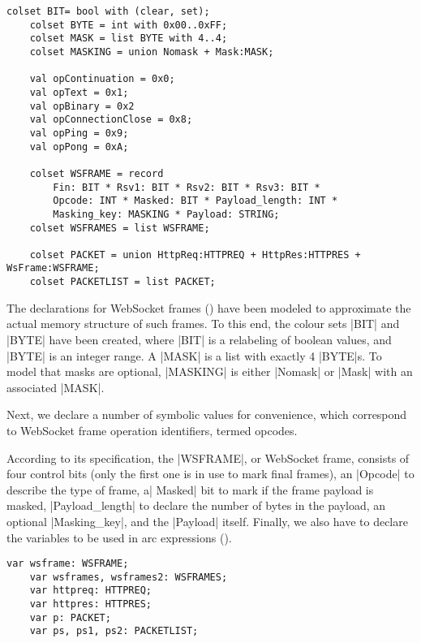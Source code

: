 	\begin{lstlisting}[label=lst:client_lib_colset_ws,caption=WebSocket colour
	sets,gobble=1,float] 
	colset BIT= bool with (clear, set);
	colset BYTE = int with 0x00..0xFF;
	colset MASK = list BYTE with 4..4;
	colset MASKING = union Nomask + Mask:MASK;
	
	val opContinuation = 0x0;
	val opText = 0x1;
	val opBinary = 0x2
	val opConnectionClose = 0x8;
	val opPing = 0x9;
	val opPong = 0xA;
	
	colset WSFRAME = record
		Fin: BIT * Rsv1: BIT * Rsv2: BIT * Rsv3: BIT * 
		Opcode: INT * Masked: BIT * Payload_length: INT * 
		Masking_key: MASKING * Payload: STRING;
	colset WSFRAMES = list WSFRAME;
	
	colset PACKET = union HttpReq:HTTPREQ + HttpRes:HTTPRES + WsFrame:WSFRAME;
	colset PACKETLIST = list PACKET;
	\end{lstlisting}
	
	The declarations for WebSocket frames () have
	been modeled to approximate the actual memory structure of such frames. To this
	end, the colour sets |BIT| and |BYTE| have been created, where |BIT| is a
	relabeling of boolean values, and |BYTE| is an integer range. A |MASK| is a
	list with exactly 4 |BYTE|s. To model that masks are optional, |MASKING| is
	either |Nomask| or |Mask| with an associated |MASK|.
	
	Next, we declare a number of symbolic values for convenience, which correspond
	to WebSocket frame operation identifiers, termed opcodes. 
	
	According to its specification, the |WSFRAME|, or WebSocket frame, consists
	of four control bits (only the first one is in use to mark final frames), an
	|Opcode| to describe the type of frame, a| Masked| bit to mark if the frame
	payload is masked, |Payload_length| to declare the number of bytes in the
	payload, an optional |Masking_key|, and the |Payload| itself. Finally, we
	also have to declare the variables to be used in arc expressions
	().
	
	\begin{lstlisting}[label=lst:client_lib_vars,caption=WebSocket
	Module Variables,gobble=1,float=h] 
	var wsframe: WSFRAME;
	var wsframes, wsframes2: WSFRAMES;
	var httpreq: HTTPREQ;
	var httpres: HTTPRES;
	var p: PACKET;
	var ps, ps1, ps2: PACKETLIST;
	\end{lstlisting}
	
